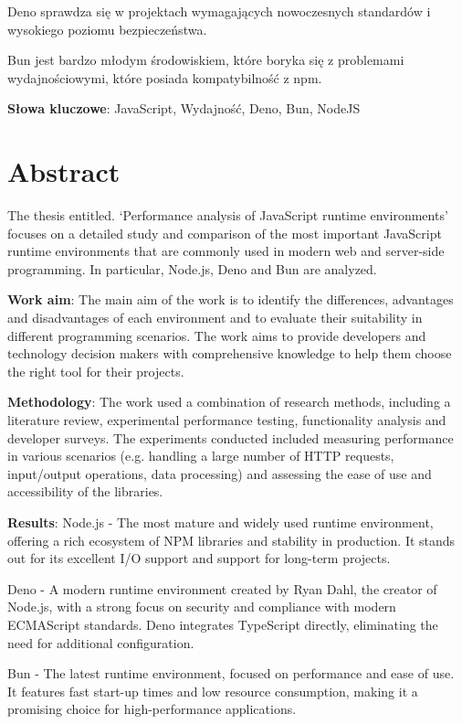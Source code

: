 Deno sprawdza się w projektach wymagających nowoczesnych standardów i wysokiego poziomu bezpieczeństwa.

Bun jest bardzo młodym środowiskiem, które boryka się z problemami wydajnościowymi, które posiada kompatybilność z npm.

\bigskip

\textbf{Słowa kluczowe}: JavaScript, Wydajność, Deno, Bun, NodeJS
\newpage

\section*{Abstract}
The thesis entitled. ‘Performance analysis of JavaScript runtime environments’ focuses on a detailed study and comparison of the most important JavaScript runtime environments that are commonly used in modern web and server-side programming. In particular, Node.js, Deno and Bun are analyzed.

\textbf{Work aim}: The main aim of the work is to identify the differences, advantages and disadvantages of each environment and to evaluate their suitability in different programming scenarios. The work aims to provide developers and technology decision makers with comprehensive knowledge to help them choose the right tool for their projects.

\textbf{Methodology}: The work used a combination of research methods, including a literature review, experimental performance testing, functionality analysis and developer surveys. The experiments conducted included measuring performance in various scenarios (e.g. handling a large number of HTTP requests, input/output operations, data processing) and assessing the ease of use and accessibility of the libraries.

\textbf{Results}:
Node.js - The most mature and widely used runtime environment, offering a rich ecosystem of NPM libraries and stability in production. It stands out for its excellent I/O support and support for long-term projects.

Deno - A modern runtime environment created by Ryan Dahl, the creator of Node.js, with a strong focus on security and compliance with modern ECMAScript standards. Deno integrates TypeScript directly, eliminating the need for additional configuration.

Bun - The latest runtime environment, focused on performance and ease of use. It features fast start-up times and low resource consumption, making it a promising choice for high-performance applications.

